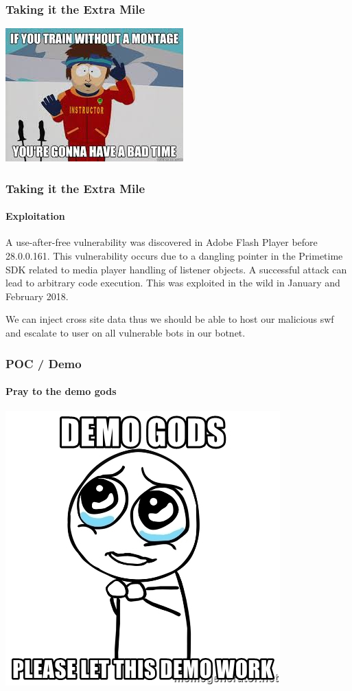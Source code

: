 \documentclass[aspectratio=169]{beamer}
\begin{document}
\begin{frame}
  \frametitle{Taking it the Extra Mile}
  \begin{center}
    \includegraphics[scale=0.5]{montage}
  \end{center}
\end{frame}
\begin{frame}
  \frametitle{Taking it the Extra Mile}
  \framesubtitle{Exploitation}
  \begin{center}
    \begin{tcolorbox}[title=CVE-2018-4878,colback=gray]
      A use-after-free vulnerability was discovered in Adobe Flash Player before 28.0.0.161. This vulnerability occurs due to a dangling pointer in the Primetime SDK related to media player handling of listener objects. A successful attack can lead to arbitrary code execution. This was exploited in the wild in January and February 2018. 
    \end{tcolorbox}
    \bigskip
    We can inject cross site data thus we should be able to host our malicious swf and escalate to user on all vulnerable bots in our botnet.
  \end{center}
\end{frame}
\begin{frame}
  \frametitle{POC / Demo}
  \framesubtitle{Pray to the demo gods}
  \begin{center}
    \includegraphics[scale=0.4]{demogods}
  \end{center}
\end{frame}
\end{document}

